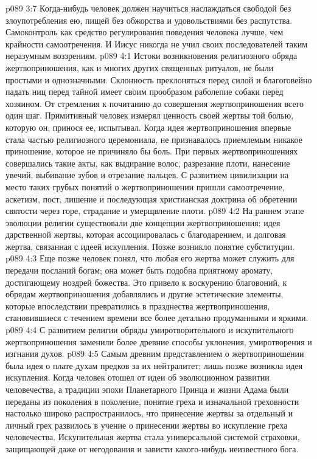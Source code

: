 \vs p089 3:7 \pc Когда\hyp{}нибудь человек должен научиться наслаждаться свободой без злоупотребления ею, пищей без обжорства и удовольствиями без распутства. Самоконтроль как средство регулирования поведения человека лучше, чем крайности самоотречения. И Иисус никогда не учил своих последователей таким неразумным воззрениям.
\vs p089 4:1 Истоки возникновения религиозного обряда жертвоприношения, как и многих других священных ритуалов, не были простыми и однозначными. Склонность преклоняться перед силой и благоговейно падать ниц перед тайной имеет своим прообразом раболепие собаки перед хозяином. От стремления к почитанию до совершения жертвоприношения всего один шаг. Примитивный человек измерял ценность своей жертвы той болью, которую он, принося ее, испытывал. Когда идея жертвоприношения впервые стала частью религиозного церемониала, не признавалось приемлемым никакое приношение, которое не причиняло бы боль. При первых жертвоприношениях совершались такие акты, как выдирание волос, разрезание плоти, нанесение увечий, выбивание зубов и отрезание пальцев. С развитием цивилизации на место таких грубых понятий о жертвоприношении пришли самоотречение, аскетизм, пост, лишение и последующая христианская доктрина об обретении святости через горе, страдание и умерщвление плоти.
\vs p089 4:2 На раннем этапе эволюции религии существовали две концепции жертвоприношения: идея дарственной жертвы, которая ассоциировалась с благодарением, и долговая жертва, связанная с идеей искупления. Позже возникло понятие субституции.
\vs p089 4:3 Еще позже человек понял, что любая его жертва может служить для передачи посланий богам; она может быть подобна приятному аромату, достигающему ноздрей божества. Это привело к воскурению благовоний, к обрядам жертвоприношения добавлялись и другие эстетические элементы, которые впоследствии превратились в празднества жертвоприношения, становившиеся с течением времени все более детально продуманными и яркими.
\vs p089 4:4 \pc С развитием религии обряды умиротворительного и искупительного жертвоприношения заменили более древние способы уклонения, умиротворения и изгнания духов.
\vs p089 4:5 Самым древним представлением о жертвоприношении была идея о плате духам предков за их нейтралитет; лишь позже возникла идея искупления. Когда человек отошел от идеи об эволюционном развитии человечества, а традиции эпохи Планетарного Принца и жизни Адама были переданы из поколения в поколение, понятие греха и изначальной греховности настолько широко распространилось, что принесение жертвы за отдельный и личный грех развилось в учение о принесении жертвы во искупление греха человечества. Искупительная жертва стала универсальной системой страховки, защищающей даже от негодования и зависти какого\hyp{}нибудь неизвестного бога.
